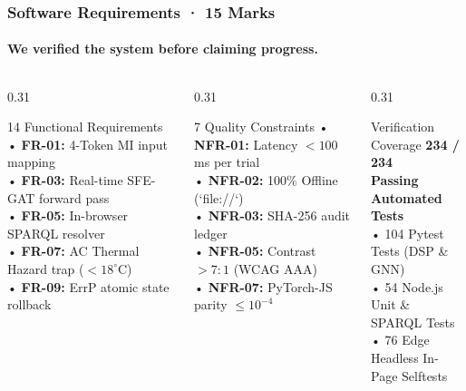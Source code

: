 \documentclass[aspectratio=169,10pt]{beamer}
\begin{document}
\begin{frame}
    \frametitle{Software Requirements · 15 Marks}
    \framesubtitle{We verified the system before claiming progress.}
    \begin{columns}[T]
        \begin{column}{0.31\textwidth}
            \begin{block}{\small 14 Functional Requirements}
                \scriptsize
                • \textbf{FR-01:} 4-Token MI input mapping\\
                • \textbf{FR-03:} Real-time SFE-GAT forward pass\\
                • \textbf{FR-05:} In-browser SPARQL resolver\\
                • \textbf{FR-07:} AC Thermal Hazard trap ($< 18^\circ$C)\\
                • \textbf{FR-09:} ErrP atomic state rollback
            \end{block}
        \end{column}
        \begin{column}{0.31\textwidth}
            \begin{block}{\small 7 Quality Constraints}
                \scriptsize
                • \textbf{NFR-01:} Latency $< 100$\,ms per trial\\
                • \textbf{NFR-02:} 100\% Offline (`file://`)\\
                • \textbf{NFR-03:} SHA-256 audit ledger\\
                • \textbf{NFR-05:} Contrast $> 7:1$ (WCAG AAA)\\
                • \textbf{NFR-07:} PyTorch-JS parity $\le 10^{-4}$
            \end{block}
        \end{column}
        \begin{column}{0.31\textwidth}
            \begin{block}{\small Verification Coverage}
                \scriptsize
                \Large \textbf{\color{ForestGreen}234 / 234}\\
                \scriptsize \textbf{Passing Automated Tests}\\
                • 104 Pytest Tests (DSP \& GNN)\\
                • 54 Node.js Unit \& SPARQL Tests\\
                • 76 Edge Headless In-Page Selftests
            \end{block}
        \end{column}
    \end{columns}
\end{frame}
\end{document}
